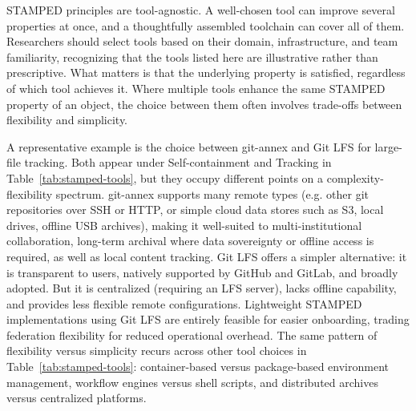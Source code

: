 \documentclass{article}
\begin{document}
STAMPED principles are tool-agnostic.
A well-chosen tool can improve several properties at once, and a thoughtfully assembled toolchain can cover all of them.
Researchers should select tools based on their domain, infrastructure, and team familiarity, recognizing that the tools listed here are illustrative rather than prescriptive.
What matters is that the underlying property is satisfied, regardless of which tool achieves it.
Where multiple tools enhance the same STAMPED property of an object, the choice between them often involves trade-offs between flexibility and simplicity.

A representative example is the choice between git-annex and Git LFS for large-file tracking.
Both appear under Self-containment and Tracking in Table~\ref{tab:stamped-tools}, but they occupy different points on a complexity-flexibility spectrum.
git-annex supports many remote types (e.g. other git repositories over SSH or HTTP, or simple cloud data stores such as S3, local drives, offline USB archives), making it well-suited to multi-institutional collaboration, long-term archival where data sovereignty or offline access is required, as well as local content tracking.
Git LFS offers a simpler alternative: it is transparent to users, natively supported by GitHub and GitLab, and broadly adopted.
But it is centralized (requiring an LFS server), lacks offline capability, and provides less flexible remote configurations.
Lightweight STAMPED implementations using Git LFS are entirely feasible for easier onboarding, trading federation flexibility for reduced operational overhead.
The same pattern of flexibility versus simplicity recurs across other tool choices in Table~\ref{tab:stamped-tools}: container-based versus package-based environment management, workflow engines versus shell scripts, and distributed archives versus centralized platforms.
\end{document}

